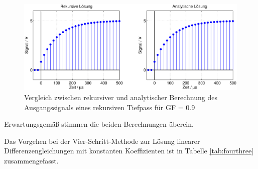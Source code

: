 \begin{figure}[H]
  \centerline{\includegraphics[width=1\textwidth]{Kapitel4/Bilder/image11.eps}}
  \caption{Vergleich zwischen rekursiver und analytischer Berechnung des Ausgangssignals eines rekursiven Tiefpass f\"{u}r GF = 0.9}
  \label{fig:RCRekursivAnalytisch}
\end{figure}

\noindent Erwartungsgem\"{a}{\ss} stimmen die beiden Berechnungen \"{u}berein.\bigskip

\noindent Das Vorgehen bei der Vier-Schritt-Methode zur L\"{o}sung linearer Differenzengleichungen mit konstanten Koeffizienten ist in Tabelle \ref{tab:fourthree} zusammengefasst.

